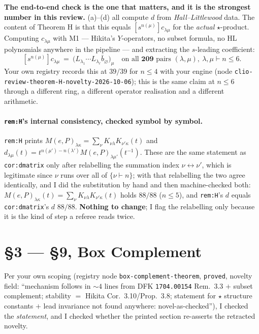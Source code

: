 \documentclass[11pt]{article}
\begin{document}
\noindent\textbf{The end-to-end check is the one that matters, and it is the strongest number in this
review.} (a)--(d) all compute $d$ from \emph{Hall--Littlewood} data. The content of Theorem H is that
this equals $[s^{n(\mu)}]c_{\lambda\mu}$ for the \emph{actual} $\star$-product. Computing
$c_{\lambda\mu}$ with M1 --- Hikita's $Y$-operators, no subset formula, no HL polynomials anywhere in
the pipeline --- and extracting the $s$-leading coefficient:
\[ \boxed{\ [s^{n(\mu)}]c_{\lambda\mu}\ =\ \bigl(L_{\lambda_1}\cdots L_{\lambda_\ell}\bar b_\varnothing\bigr)_\mu
   \quad\text{on all }\mathbf{209}\text{ pairs }(\lambda,\mu),\ \lambda,\mu\vdash n\le6.\ } \]
Your own registry records this at $39/39$ for $n\le4$ with your engine (node
\texttt{clio-review-theorem-H-novelty-2026-10-06}); this is the same claim at $n\le6$ through a
different ring, a different operator realisation and a different arithmetic.

\paragraph{\texttt{rem:H}'s internal consistency, checked symbol by symbol.}
\texttt{rem:H} prints $M(e,P)_{\lambda\kappa}=\sum_\nu K_{\nu\lambda}K_{\nu'\kappa}(t)$ and
$d_{\lambda\mu}(t)=t^{n(\mu')-n(\lambda')}M(e,P)_{\lambda\mu'}(t^{-1})$. These are the same statement as
\texttt{cor:dmatrix} only after relabelling the summation index $\nu\leftrightarrow\nu'$, which is
legitimate since $\nu$ runs over all of $\{\nu\vdash n\}$; with that relabelling the two agree
identically, and I did the substitution by hand and then machine-checked both:
$M(e,P)_{\lambda\kappa}(t)=\sum_\nu K_{\nu\lambda}K_{\nu'\kappa}(t)$ holds $88/88$ ($n\le5$), and
\texttt{rem:H}'s $d$ equals \texttt{cor:dmatrix}'s $d$ $88/88$. \textbf{Nothing to change}; I flag the
relabelling only because it is the kind of step a referee reads twice.

\section{\S3 --- \S9, Box Complement}

Per your own scoping (registry node \texttt{box-complement-theorem}, \texttt{proved}, novelty field:
``mechanism follows in $\sim4$ lines from DFK \texttt{1704.00154} Rem.~3.3 $+$ subset complement;
stability $=$ Hikita Cor.~3.10/Prop.~3.8; statement for $\star$ structure constants $+$ lead invariance
not found anywhere: novel-as-checked''), I checked the \emph{statement}, and I checked whether the
printed section re-asserts the retracted novelty.
\end{document}
